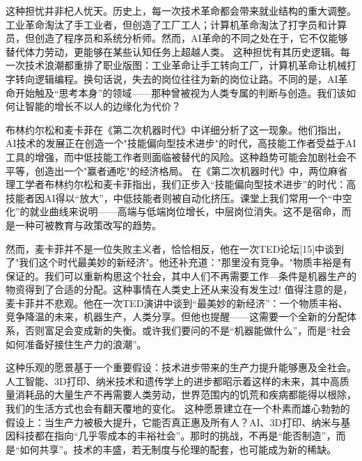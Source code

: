 这种担忧并非杞人忧天。历史上，每一次技术革命都会带来就业结构的重大调整。工业革命淘汰了手工业者，但创造了工厂工人；计算机革命淘汰了打字员和计算员，但创造了程序员和系统分析师。然而，AI革命的不同之处在于，它不仅能够替代体力劳动，更能够在某些认知任务上超越人类。
这种担忧有其历史逻辑。每一次技术浪潮都重排了职业版图：工业革命让手工转向工厂，计算机革命让机械打字转向逻辑编程。换句话说，失去的岗位往往为新的岗位让路。不同的是，AI革命开始触及“思考本身”的领域——那种曾被视为人类专属的判断与创造。我们该如何让智能的增长不以人的边缘化为代价？

布林约尔松和麦卡菲在《第二次机器时代》中详细分析了这一现象。他们指出，AI技术的发展正在创造一个"技能偏向型技术进步"的时代，高技能工作者受益于AI工具的增强，而中低技能工作者则面临被替代的风险。这种趋势可能会加剧社会不平等，创造出一个"赢者通吃"的经济格局。
在《第二次机器时代》中，两位麻省理工学者布林约尔松和麦卡菲指出，我们正步入“技能偏向型技术进步”的时代：高技能者因AI得以“放大”，中低技能者则被自动化挤压。课堂上我们常用一个“中空化”的就业曲线来说明——高端与低端岗位增长，中层岗位消失。这不是宿命，而是一种可被教育与政策改写的趋势。

然而，麦卡菲并不是一位失败主义者，恰恰相反，他在一次TED论坛[15]中谈到了"我们这个时代最美妙的新经济"。他还补充道："那里没有竞争。"物质丰裕是有保证的。我们可以重新构思这个社会，其中人们不再需要工作---条件是机器生产的物资得到了合适的分配。这种事情在人类史上还从来没有发生过!
值得注意的是，麦卡菲并不悲观。他在一次TED演讲中谈到“最美妙的新经济”：一个物质丰裕、竞争降温的未来，机器生产，人类分享。但他也提醒——这需要一个全新的分配体系，否则富足会变成新的失衡。或许我们要问的不是“机器能做什么”，而是“社会如何准备好接住生产力的浪潮”。

这种乐观的愿景基于一个重要假设：技术进步带来的生产力提升能够惠及全社会。人工智能、3D打印、纳米技术和遗传学上的进步都昭示着这样的未来，其中高质量消耗品的大量生产不再需要人类劳动，世界范围内的饥荒和疾病都能得以根除，我们的生活方式也会有翻天覆地的变化。
这种愿景建立在一个朴素而雄心勃勃的假设上：当生产力被极大提升，它能否真正惠及所有人？AI、3D打印、纳米与基因科技都在指向“几乎零成本的丰裕社会”。那时的挑战，不再是“能否制造”，而是“如何共享”。技术的丰盛，若无制度与伦理的配套，也可能成为新的稀缺。

